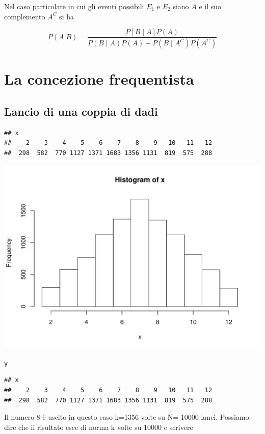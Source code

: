 \documentclass[onecolumn,12pt]{book}\usepackage[]{graphicx}\usepackage[]{color}
\makeatletter
\def\maxwidth{ %
  \ifdim\Gin@nat@width>\linewidth
    \linewidth
  \else
    \Gin@nat@width
  \fi
}
\newcommand{\hlstd}[1]{\textcolor[rgb]{0.345,0.345,0.345}{#1}}%
\newenvironment{kframe}{%
 \def\at@end@of@kframe{}%
 \ifinner\ifhmode%
  \def\at@end@of@kframe{\end{minipage}}%
  \begin{minipage}{\columnwidth}%
 \fi\fi%
 \def\FrameCommand##1{\hskip\@totalleftmargin \hskip-\fboxsep
 \colorbox{shadecolor}{##1}\hskip-\fboxsep
     \hskip-\linewidth \hskip-\@totalleftmargin \hskip\columnwidth}%
 \MakeFramed {\advance\hsize-\width
   \@totalleftmargin\z@ \linewidth\hsize
   \@setminipage}}%
 {\par\unskip\endMakeFramed%
 \at@end@of@kframe}
\newenvironment{knitrout}{}{} %
\makeatother
\begin{document}
Nel caso particolare in cui gli eventi possibili 
$E_1$ e $E_2$ siano $A$ e il suo complemento  $A^C$ si ha

$$P (A|B)=  \dfrac{P[B\mid A] P(A)}{P (B\mid A) P(A)+P(B\mid  A^C) P( A^C)}$$


 
 


\section{La concezione frequentista}
 

\subsection{Lancio di una coppia di dadi}

\begin{knitrout}
\color{fgcolor}\begin{kframe}
\begin{verbatim}
## x
##    2    3    4    5    6    7    8    9   10   11   12 
##  298  582  770 1127 1371 1683 1356 1131  819  575  288
\end{verbatim}
\end{kframe}
\includegraphics[width=\maxwidth]{figure/unnamed-chunk-14-1} 

\end{knitrout}

 

\begin{knitrout}
\color{fgcolor}\begin{kframe}
\begin{alltt}
\hlstd{y}
\end{alltt}
\begin{verbatim}
## x
##    2    3    4    5    6    7    8    9   10   11   12 
##  298  582  770 1127 1371 1683 1356 1131  819  575  288
\end{verbatim}
\end{kframe}
\end{knitrout}
Il numero 8 è uscito in questo caso k=1356 volte su N= 10000 lanci.  
Possiamo dire che il risultato esce di norma k  volte su 10000 e scrivere 
\end{document}
